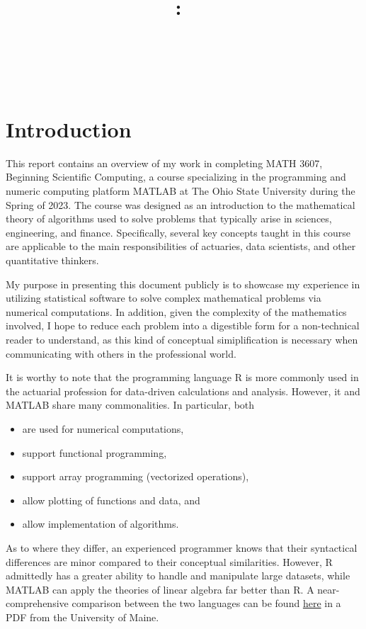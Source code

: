 \documentclass[letterpaper,12pt]{article}
\title{
    \vspace{2in}
    \textmd{\textbf{\Class:\ \\ \Title}}\\
    \vspace{3in}
}
\author{\AuthorName \vspace{2pt}\\ \textit{\ClassInstructor}}
\date{}
\begin{document}
\maketitle
\pagebreak

\section*{Introduction}

This report contains an overview of my work in completing MATH 3607, Beginning Scientific Computing, a course specializing in the programming and numeric computing platform MATLAB at The Ohio State University during the Spring of 2023.  The course was designed as an introduction to the mathematical theory of algorithms used to solve problems that typically arise in sciences, engineering, and finance.  Specifically, several key concepts taught in this course are applicable to the main responsibilities of actuaries, data scientists, and other quantitative thinkers. 

My purpose in presenting this document publicly is to showcase my experience in utilizing statistical software to solve complex mathematical problems via numerical computations.  In addition, given the complexity of the mathematics involved, I hope to reduce each problem into a digestible form for a non-technical reader to understand, as this kind of conceptual simiplification is necessary when communicating with others in the professional world.

It is worthy to note that the programming language R is more commonly used in the actuarial profession for data-driven calculations and analysis. However, it and MATLAB share many commonalities. In particular, both
\begin{itemize}
	\item are used for numerical computations,
	\item support functional programming,
	\item support array programming (vectorized operations),
	\item allow plotting of functions and data, and
	\item allow implementation of algorithms.
\end{itemize}

As to where they differ, an experienced programmer knows that their syntactical differences are minor compared to their conceptual similarities.  However, R admittedly has a greater ability to handle and manipulate large datasets, while MATLAB can apply the theories of linear algebra far better than R.  A near-comprehensive comparison between the two languages can be found \href{https://cran.r-project.org/doc/contrib/Hiebeler-matlabR.pdf}{here} in a PDF from the University of Maine.
\end{document}
